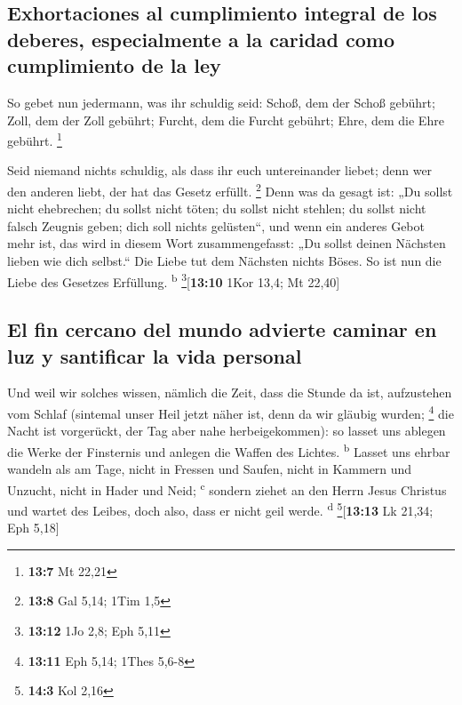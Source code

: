 \hypertarget{exhortaciones-al-cumplimiento-integral-de-los-deberes-especialmente-a-la-caridad-como-cumplimiento-de-la-ley}{%
\subsection{Exhortaciones al cumplimiento integral de los deberes,
especialmente a la caridad como cumplimiento de la
ley}\label{exhortaciones-al-cumplimiento-integral-de-los-deberes-especialmente-a-la-caridad-como-cumplimiento-de-la-ley}}

 So gebet nun jedermann, was ihr schuldig seid: Schoß, dem
der Schoß gebührt; Zoll, dem der Zoll gebührt; Furcht, dem die Furcht
gebührt; Ehre, dem die Ehre gebührt. \footnote{\textbf{13:7} Mt 22,21}

 Seid niemand nichts schuldig, als dass ihr euch
untereinander liebet; denn wer den anderen liebt, der hat das Gesetz
erfüllt. \footnote{\textbf{13:8} Gal 5,14; 1Tim 1,5}  Denn
was da gesagt ist: „Du sollst nicht ehebrechen; du sollst nicht töten;
du sollst nicht stehlen; du sollst nicht falsch Zeugnis geben; dich soll
nichts gelüsten``, und wenn ein anderes Gebot mehr ist, das wird in
diesem Wort zusammengefasst: „Du sollst deinen Nächsten lieben wie dich
selbst.``  Die Liebe tut dem Nächsten nichts Böses. So
ist nun die Liebe des Gesetzes Erfüllung. \textsuperscript{b}
\footnote{\textbf{13:12} 1Jo 2,8; Eph 5,11}{[}\textbf{13:10} 1Kor 13,4;
Mt 22,40{]}

\hypertarget{el-fin-cercano-del-mundo-advierte-caminar-en-luz-y-santificar-la-vida-personal}{%
\subsection{El fin cercano del mundo advierte caminar en luz y
santificar la vida
personal}\label{el-fin-cercano-del-mundo-advierte-caminar-en-luz-y-santificar-la-vida-personal}}

 Und weil wir solches wissen, nämlich die Zeit, dass die
Stunde da ist, aufzustehen vom Schlaf (sintemal unser Heil jetzt näher
ist, denn da wir gläubig wurden; \footnote{\textbf{13:11} Eph 5,14;
  1Thes 5,6-8}  die Nacht ist vorgerückt, der Tag aber
nahe herbeigekommen): so lasset uns ablegen die Werke der Finsternis und
anlegen die Waffen des Lichtes. \textsuperscript{b} 
Lasset uns ehrbar wandeln als am Tage, nicht in Fressen und Saufen,
nicht in Kammern und Unzucht, nicht in Hader und Neid;
\textsuperscript{c}  sondern ziehet an den Herrn Jesus
Christus und wartet des Leibes, doch also, dass er nicht geil werde.
\textsuperscript{d} \footnote{\textbf{14:3} Kol 2,16}{[}\textbf{13:13}
Lk 21,34; Eph 5,18{]}

